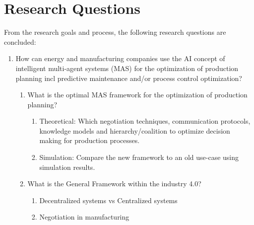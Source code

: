 \section{Research Questions}
From the research goals and process, the following research questions are concluded:
\begin{enumerate}
	\item
	How can energy and manufacturing companies use the AI concept of intelligent multi-agent systems (MAS) for the optimization of production planning incl predictive maintenance and/or process control optimization?
	\begin{enumerate}
		\item
		What is the optimal MAS framework for the optimization of production planning?
		\begin{enumerate}
			\item 
			Theoretical: Which negotiation techniques, communication protocols, knowledge models and hierarchy/coalition to optimize decision making for production processes.
			\item
			Simulation: Compare the new framework to an old use-case using simulation results.
		\end{enumerate}
		\item
		What is the General Framework within the industry 4.0?
		\begin{enumerate}
			\item 
			Decentralized systems vs Centralized systems
			\item
			Negotiation in manufacturing
		\end{enumerate}
	\end{enumerate}
\end{enumerate}

